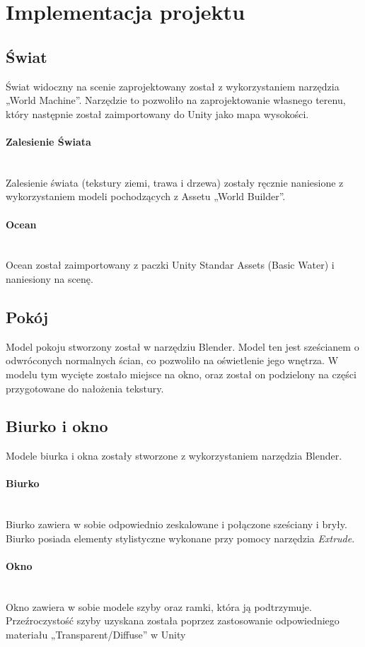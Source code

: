 \section{Implementacja projektu}

\subsection{Świat}
Świat widoczny na scenie zaprojektowany został z wykorzystaniem narzędzia „World Machine”. Narzędzie to pozwoliło na zaprojektowanie własnego terenu, który następnie został zaimportowany do Unity jako mapa wysokości. 
\paragraph{Zalesienie Świata}
\mbox{}\\
Zalesienie świata (tekstury ziemi, trawa i drzewa) zostały ręcznie naniesione z wykorzystaniem modeli pochodzących z Assetu „World Builder”. 
\paragraph{Ocean}
\mbox{}\\
Ocean został zaimportowany z paczki Unity Standar Assets (Basic Water) i naniesiony na scenę. 

\subsection{Pokój}
Model pokoju stworzony został w narzędziu Blender. Model ten jest sześcianem o odwróconych normalnych ścian, co pozwoliło na oświetlenie jego wnętrza. W modelu tym wycięte zostało miejsce na okno, oraz został on podzielony na części przygotowane do nałożenia tekstury.

\subsection{Biurko i okno}
Modele biurka i okna zostały stworzone z wykorzystaniem narzędzia Blender.

\paragraph{Biurko}
\mbox{}\\
Biurko zawiera w sobie odpowiednio zeskalowane i połączone sześciany i bryły. Biurko posiada elementy stylistyczne wykonane przy pomocy narzędzia \textit{Extrude}.
\paragraph{Okno}
\mbox{}\\
Okno zawiera w sobie modele szyby oraz ramki, która ją podtrzymuje. Przeźroczystość szyby uzyskana została poprzez zastosowanie odpowiedniego materiału „Transparent/Diffuse” w Unity

